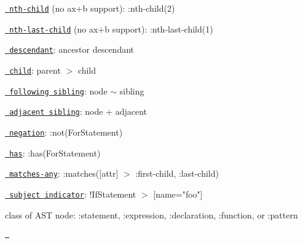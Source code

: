 \begin{DoxyItemize}
\item \href{http://dev.w3.org/csswg/selectors4/\#the-nth-child-pseudo}{\texttt{ nth-\/child}} (no ax+b support)\+: {\ttfamily \+:nth-\/child(2)}
\item \href{http://dev.w3.org/csswg/selectors4/\#the-nth-last-child-pseudo}{\texttt{ nth-\/last-\/child}} (no ax+b support)\+: {\ttfamily \+:nth-\/last-\/child(1)}
\item \href{http://dev.w3.org/csswg/selectors4/\#descendant-combinators}{\texttt{ descendant}}\+: {\ttfamily ancestor descendant}
\item \href{http://dev.w3.org/csswg/selectors4/\#child-combinators}{\texttt{ child}}\+: {\ttfamily parent \texorpdfstring{$>$}{>} child}
\item \href{http://dev.w3.org/csswg/selectors4/\#general-sibling-combinators}{\texttt{ following sibling}}\+: {\ttfamily node \texorpdfstring{$\sim$}{\string~} sibling}
\item \href{http://dev.w3.org/csswg/selectors4/\#adjacent-sibling-combinators}{\texttt{ adjacent sibling}}\+: {\ttfamily node + adjacent}
\item \href{http://dev.w3.org/csswg/selectors4/\#negation-pseudo}{\texttt{ negation}}\+: {\ttfamily \+:not(\+For\+Statement)}
\item \href{https://drafts.csswg.org/selectors-4/\#has-pseudo}{\texttt{ has}}\+: {\ttfamily \+:has(\+For\+Statement)}
\item \href{http://dev.w3.org/csswg/selectors4/\#matches}{\texttt{ matches-\/any}}\+: {\ttfamily \+:matches(\mbox{[}attr\mbox{]} \texorpdfstring{$>$}{>} \+:first-\/child, \+:last-\/child)}
\item \href{http://dev.w3.org/csswg/selectors4/\#subject}{\texttt{ subject indicator}}\+: {\ttfamily !\+If\+Statement \texorpdfstring{$>$}{>} \mbox{[}name="{}foo"{}\mbox{]}}
\item class of AST node\+: {\ttfamily \+:statement}, {\ttfamily \+:expression}, {\ttfamily \+:declaration}, {\ttfamily \+:function}, or {\ttfamily \+:pattern}
\end{DoxyItemize}

\href{https://travis-ci.org/estools/esquery}{\texttt{ }} 